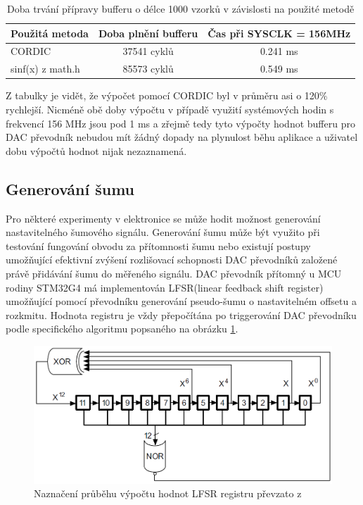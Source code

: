 \begin{table}[H]
	\begin{tabular}{lcc}
		\multicolumn{1}{c}{Použitá metoda} & Doba plnění bufferu  &  Čas při SYSCLK = 156MHz \\ \hline
		CORDIC                             & 37541	cyklů         &0.241 ms\\
		sinf(x) z math.h                   & 85573  cyklů  		  & 0.549 ms
	\end{tabular}
	\caption{Doba trvání přípravy bufferu o délce 1000 vzorků v závislosti na použité metodě}
	\label{tab:CordicPerformance}
\end{table}

 Z tabulky je vidět, že výpočet pomocí CORDIC byl v průměru asi o 120\% rychlejší. Nicméně obě doby výpočtu v případě využití systémových hodin s frekvencí 156 MHz jsou pod 1 ms a zřejmě tedy tyto výpočty hodnot bufferu pro DAC převodník nebudou mít žádný dopady na plynulost běhu aplikace a uživatel dobu výpočtů hodnot nijak nezaznamená. 
\subsection{Generování šumu}
\label{ch:noiseGeneration}
Pro některé experimenty v elektronice se může hodit možnost generování nastavitelného šumového signálu. Generování šumu může být využito při testování fungování obvodu za přítomnosti šumu nebo existují postupy umožňující efektivní zvýšení rozlišovací schopnosti DAC převodníků založené právě přidávání šumu do měřeného signálu. DAC převodník přítomný u MCU rodiny STM32G4 má implementován LFSR(linear feedback shift register) umožňující pomocí převodníku generování pseudo-šumu o nastavitelném offsetu a rozkmitu. Hodnota registru je vždy přepočítána po triggerování DAC převodníku podle specifického algoritmu popsaného na obrázku \ref{fig:noiselfsrcalculation}. 
\begin{figure}[H]
	\centering
	\includegraphics[width=0.7\linewidth]{Figs/Diagrams/NOISE_LFSR_Calculation}
	\caption{Naznačení průběhu výpočtu hodnot LFSR registru převzato z \cite{refG4}}
	\label{fig:noiselfsrcalculation}
\end{figure}


